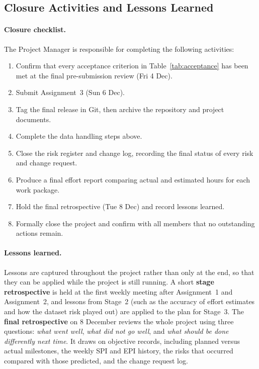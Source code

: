 \subsection{Closure Activities and Lessons Learned}\label{sec:closure-activities}

\paragraph{Closure checklist.} The Project Manager is responsible for completing the following activities:

\begin{enumerate}[nosep]
  \item Confirm that every acceptance criterion in Table~\ref{tab:acceptance} has been met at the final pre-submission review (Fri 4 Dec).
  \item Submit Assignment~3 (Sun 6 Dec).
  \item Tag the final release in Git, then archive the repository and project documents.
  \item Complete the data handling steps above.
  \item Close the risk register and change log, recording the final status of every risk and change request.
  \item Produce a final effort report comparing actual and estimated hours for each work package.
  \item Hold the final retrospective (Tue 8 Dec) and record lessons learned.
  \item Formally close the project and confirm with all members that no outstanding actions remain.
\end{enumerate}

\paragraph{Lessons learned.} Lessons are captured throughout the project rather than only at the end, so that they can be applied while the project is still running. A short \textbf{stage retrospective} is held at the first weekly meeting after Assignment~1 and Assignment~2, and lessons from Stage~2 (such as the accuracy of effort estimates and how the dataset risk played out) are applied to the plan for Stage~3. The \textbf{final retrospective} on 8 December reviews the whole project using three questions: \emph{what went well}, \emph{what did not go well}, and \emph{what should be done differently next time}. It draws on objective records, including planned versus actual milestones, the weekly SPI and EPI history, the risks that occurred compared with those predicted, and the change request log.

